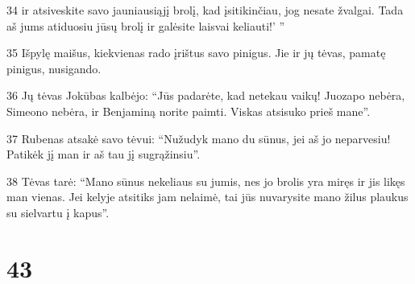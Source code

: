 \par 34 ir atsiveskite savo jauniausiąjį brolį, kad įsitikinčiau, jog nesate žvalgai. Tada aš jums atiduosiu jūsų brolį ir galėsite laisvai keliauti!’ ” 
\par 35 Išpylę maišus, kiekvienas rado įrištus savo pinigus. Jie ir jų tėvas, pamatę pinigus, nusigando. 
\par 36 Jų tėvas Jokūbas kalbėjo: “Jūs padarėte, kad netekau vaikų! Juozapo nebėra, Simeono nebėra, ir Benjaminą norite paimti. Viskas atsisuko prieš mane”. 
\par 37 Rubenas atsakė savo tėvui: “Nužudyk mano du sūnus, jei aš jo neparvesiu! Patikėk jį man ir aš tau jį sugrąžinsiu”. 
\par 38 Tėvas tarė: “Mano sūnus nekeliaus su jumis, nes jo brolis yra miręs ir jis likęs man vienas. Jei kelyje atsitiks jam nelaimė, tai jūs nuvarysite mano žilus plaukus su sielvartu į kapus”.



\chapter{43}


